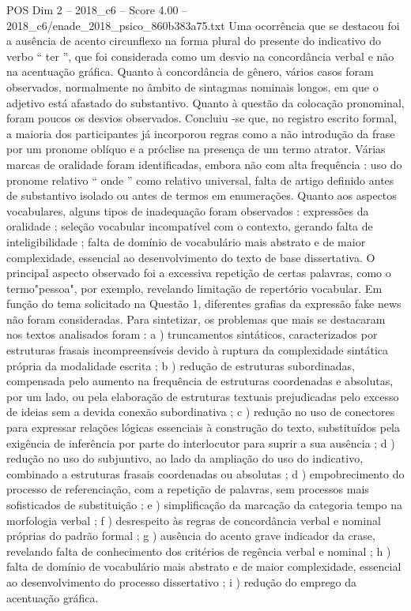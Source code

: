 \begin{textsample}{POS Dim 2 – 2018\_c6 – Score 4.00 – 2018\_c6/enade\_2018\_psico\_860b383a75.txt}
Uma ocorrência que se destacou foi a ausência de acento circunflexo na forma plural do presente do indicativo do verbo “ ter ”, que foi considerada como um desvio na concordância verbal e não na acentuação gráfica.
Quanto à concordância de gênero, vários casos foram observados, normalmente no âmbito de sintagmas nominais longos, em que o adjetivo está afastado do substantivo.
Quanto à questão da colocação pronominal, foram poucos os desvios observados.
Concluiu -se que, no registro escrito formal, a maioria dos participantes já incorporou regras como a não introdução da frase por um pronome oblíquo e a próclise na presença de um termo atrator.
Várias marcas de oralidade foram identificadas, embora não com alta frequência : uso do pronome relativo “ onde ” como relativo universal, falta de artigo definido antes de substantivo isolado ou antes de termos em enumerações.
Quanto aos aspectos vocabulares, alguns tipos de inadequação foram observados : expressões da oralidade ; seleção vocabular incompatível com o contexto, gerando falta de inteligibilidade ; falta de domínio de vocabulário mais abstrato e de maior complexidade, essencial ao desenvolvimento do texto de base dissertativa.
O principal aspecto observado foi a excessiva repetição de certas palavras, como o termo"pessoa", por exemplo, revelando limitação de repertório vocabular.
Em função do tema solicitado na Questão 1, diferentes grafias da expressão fake news não foram consideradas.
Para sintetizar, os problemas que mais se destacaram nos textos analisados foram : a ) truncamentos sintáticos, caracterizados por estruturas frasais incompreensíveis devido à ruptura da complexidade sintática própria da modalidade escrita ; b ) redução de estruturas subordinadas, compensada pelo aumento na frequência de estruturas coordenadas e absolutas, por um lado, ou pela elaboração de estruturas textuais prejudicadas pelo excesso de ideias sem a devida conexão subordinativa ; c ) redução no uso de conectores para expressar relações lógicas essenciais à construção do texto, substituídos pela exigência de inferência por parte do interlocutor para suprir a sua ausência ; d ) redução no uso do subjuntivo, ao lado da ampliação do uso do indicativo, combinado a estruturas frasais coordenadas ou absolutas ; d ) empobrecimento do processo de referenciação, com a repetição de palavras, sem processos mais sofisticados de substituição ; e ) simplificação da marcação da categoria tempo na morfologia verbal ; f ) desrespeito às regras de concordância verbal e nominal próprias do padrão formal ; g ) ausência do acento grave indicador da crase, revelando falta de conhecimento dos critérios de regência verbal e nominal ; h ) falta de domínio de vocabulário mais abstrato e de maior complexidade, essencial ao desenvolvimento do processo dissertativo ; i ) redução do emprego da acentuação gráfica.

\end{textsample}
